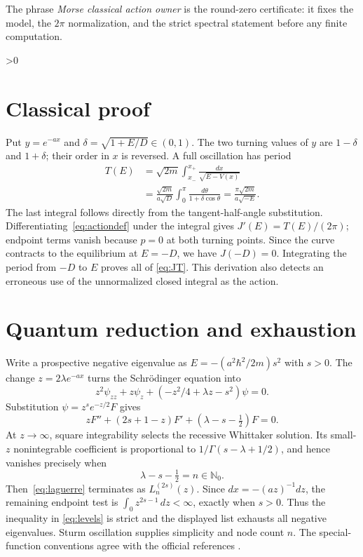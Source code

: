 \documentclass[10pt]{article}
\providecommand{\CRevisionRound}{2}
\begin{document}
The phrase \emph{Morse classical action owner} is the round-zero
certificate: it fixes the model, the $2\pi$ normalization, and the strict
spectral statement before any finite computation.

\ifnum\CRevisionRound>0
\section{Classical proof}
Put $y=e^{-ax}$ and $\delta=\sqrt{1+E/D}\in(0,1)$.  The two turning values
of $y$ are $1-\delta$ and $1+\delta$; their order in $x$ is reversed.  A
full oscillation has period
\begin{align*}
 T(E)&=\sqrt{2m}\int_{x_-}^{x_+}\frac{dx}{\sqrt{E-V(x)}}\\
 &=\frac{\sqrt{2m}}{a\sqrt D}
 \int_0^\pi\frac{d\theta}{1+\delta\cos\theta}
 =\frac{\pi\sqrt{2m}}{a\sqrt{-E}}.
\end{align*}
The last integral follows directly from the tangent-half-angle
substitution.  Differentiating~\eqref{eq:actiondef} under the integral gives
$J'(E)=T(E)/(2\pi)$; endpoint terms vanish because $p=0$ at both turning
points.  Since the curve contracts to the equilibrium at $E=-D$, we have
$J(-D)=0$.  Integrating the period from $-D$ to $E$ proves all of
\eqref{eq:JT}.  This derivation also detects an erroneous use of the
unnormalized closed integral as the action.

\section{Quantum reduction and exhaustion}
Write a prospective negative eigenvalue as
$E=-(a^2\hbar^2/2m)s^2$ with $s>0$.  The change
$z=2\lambda e^{-ax}$ turns the Schr\"odinger equation into
\begin{equation}\label{eq:whittaker}
 z^2\psi_{zz}+z\psi_z+(-z^2/4+\lambda z-s^2)\psi=0.
\end{equation}
Substitution $\psi=z^se^{-z/2}F$ gives
\begin{equation}\label{eq:laguerre}
 zF''+(2s+1-z)F'+(\lambda-s-\tfrac12)F=0.
\end{equation}
At $z\to\infty$, square integrability selects the recessive Whittaker
solution.  Its small-$z$ nonintegrable coefficient is proportional to
$1/\Gamma(s-\lambda+1/2)$, and hence vanishes precisely when
\[
 \lambda-s-\tfrac12=n\in\mathbb N_0.
\]
Then~\eqref{eq:laguerre} terminates as
$L_n^{(2s)}(z)$.  Since $dx=-(az)^{-1}dz$, the remaining endpoint test is
$\int_0 z^{2s-1}\,dz<\infty$, exactly when $s>0$.  Thus the inequality in
\eqref{eq:levels} is strict and the displayed list exhausts all negative
eigenvalues.  Sturm oscillation supplies simplicity and node count $n$.
The special-function conventions agree with the official references
\cite{DLMFL,DLMFW}.
\fi
\end{document}
